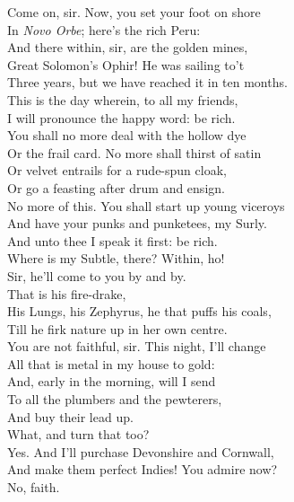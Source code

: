 \documentclass[a4paper,oneside,12pt]{memoir}
\begin{document}
\begin{drama*}
\mammonspeaks Come on, sir. Now, you set your foot on shore\\
In \emph{Novo Orbe}; here's the rich Peru:\\
And there within, sir, are the golden mines,\\
Great Solomon's Ophir! He was sailing to't\\
Three years, but we have reached it in ten months.\\
This is the day wherein, to all my friends,\\
I will pronounce the happy word: be rich.\\
You shall no more deal with the hollow dye\\
Or the frail card. No more shall thirst of satin\\
Or velvet entrails for a rude-spun cloak,\\
Or go a feasting after drum and ensign.\\
No more of this. You shall start up young viceroys\\
And have your punks and punketees, my Surly.\\
And unto thee I speak it first: be rich.\\
Where is my Subtle, there? Within, ho!\\
\facespeaks Sir, he'll come to you by and by.\\
\mammonspeaks {} That is his fire-drake,\\
His Lungs, his Zephyrus, he that puffs his coals,\\
Till he firk nature up in her own centre.\\
You are not faithful, sir. This night, I'll change\\
All that is metal in my house to gold:\\
And, early in the morning, will I send\\
To all the plumbers and the pewterers,\\
And buy their lead up.\\
\surlyspeaks {} What, and turn that too?\\
\mammonspeaks Yes. And I'll purchase Devonshire and Cornwall,\\
And make them perfect Indies! You admire now?\\
\surlyspeaks No, faith.\\

\end{drama*}
\end{document}
